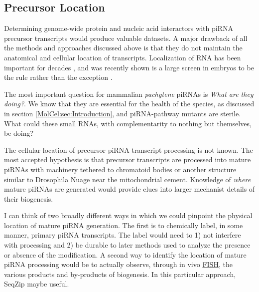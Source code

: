   \subsection{Precursor Location}
    \label{Disc:subsec:Imaging of precursors}

    Determining genome-wide protein and nucleic acid interactors with piRNA precursor transcripts would produce valuable datasets. A major drawback of all the methods and approaches discussed above is that they do not maintain the anatomical and cellular location of transcripts. Localization of RNA has been important for decades \citep{Rebagliati1985}, and was recently shown is a large screen in \flies{} embryos to be the rule rather than the exception \citep{Lecuyer2007}.

    The most important question for mammalian \textit{pachytene} piRNAs is \textit{What are they doing?}. We know that they are essential for the health of the species, as discussed in section \ref{MolCel:sec:Introduction}, and piRNA-pathway mutants are sterile. What could these small RNAs, with complementarity to nothing but themselves, be doing? 

    The cellular location of precursor piRNA transcript processing is not known. The most accepted hypothesis is that precursor transcripts are processed into mature piRNAs with machinery tethered to chromatoid bodies \citep{Meikar2011,Meikar2014} or another structure similar to Drosophila Nuage near the mitochondrial cement. Knowledge of \textit{where} mature piRNAs are generated would provide clues into larger mechanist details of their biogenesis. 

    I can think of two broadly different ways in which we could pinpoint the physical location of mature piRNA generation. The first is to chemically label, in some manner, primary piRNA transcripts. The label would need to 1) not interfere with processing and 2) be durable to later methods used to analyze the presence or absence of the modification. A second way to identify the location of mature piRNA processing would be to actually observe, through in vivo \hyperref[hd:abrevs]{FISH}, the various products and by-products of biogenesis. In this particular approach, SeqZip maybe useful.

